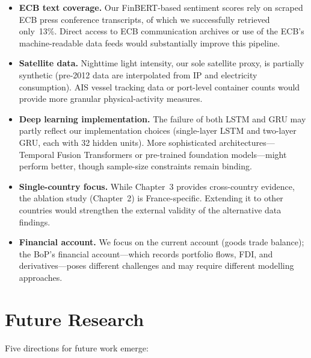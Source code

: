 \begin{itemize}
  \item \textbf{ECB text coverage.}  Our FinBERT-based sentiment scores rely on scraped ECB press conference transcripts, of which we successfully retrieved only~13\%.  Direct access to ECB communication archives or use of the ECB's machine-readable data feeds would substantially improve this pipeline.

  \item \textbf{Satellite data.}  Nighttime light intensity, our sole satellite proxy, is partially synthetic (pre-2012 data are interpolated from IP and electricity consumption).  AIS vessel tracking data or port-level container counts would provide more granular physical-activity measures.

  \item \textbf{Deep learning implementation.}  The failure of both LSTM and GRU may partly reflect our implementation choices (single-layer LSTM and two-layer GRU, each with 32 hidden units).  More sophisticated architectures---Temporal Fusion Transformers \citep{lim2021temporal} or pre-trained foundation models---might perform better, though sample-size constraints remain binding.

  \item \textbf{Single-country focus.}  While Chapter~3 provides cross-country evidence, the ablation study (Chapter~2) is France-specific.  Extending it to other countries would strengthen the external validity of the alternative data findings.

  \item \textbf{Financial account.}  We focus on the current account (goods trade balance); the BoP's financial account---which records portfolio flows, FDI, and derivatives---poses different challenges and may require different modelling approaches.
\end{itemize}


\section*{Future Research}

Five directions for future work emerge:

